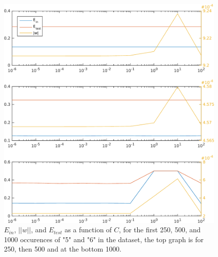 \begin{figure}
  \centering
  \includegraphics[width=\textwidth]{./56.pdf}
  \caption{$E_{in}$, $||w||$, and $E_{test}$ as a function of $C$, for the first 250, 500, and 1000 occurences of "5" and "6" in the dataset, the top graph is for 250, then 500 and at the bottom 1000.}
  \label{dueretulideligtmenneske}
\end{figure}

